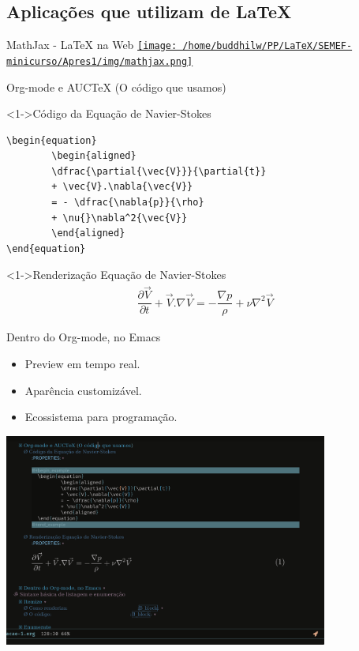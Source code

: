 \documentclass[bigger]{beamer}
\begin{document}
\subsection{Aplicações que utilizam de \LaTeX{}}
\label{sec:orgaa1ea78}
\begin{frame}[label={sec:org1a9b151}]{MathJax - \LaTeX{} na Web}
\href{img/mathjax.png}{\texttt{[image: /home/buddhilw/PP/LaTeX/SEMEF-minicurso/Apres1/img/mathjax.png]}}
\end{frame}


\begin{frame}[label={sec:org42f7375},fragile]{Org-mode e AUCTeX (O código que usamos)}
 \begin{block}<1->{Código da Equação de Navier-Stokes}
\begin{verbatim}
\begin{equation}
        \begin{aligned}
        \dfrac{\partial{\vec{V}}}{\partial{t}}
        + \vec{V}.\nabla{\vec{V}}
        = - \dfrac{\nabla{p}}{\rho}
        + \nu{}\nabla^2{\vec{V}}
        \end{aligned}
\end{equation}
\end{verbatim}
\end{block}

\begin{block}<1->{Renderização Equação de Navier-Stokes}
\begin{equation}
        \begin{aligned}
        \dfrac{\partial{\vec{V}}}{\partial{t}} + \vec{V}.\nabla{\vec{V}} = - \dfrac{\nabla{p}}{\rho} + \nu{}\nabla^2{\vec{V}}
        \end{aligned}
\end{equation}
\end{block}
\end{frame}

\begin{frame}[label={sec:org90805ea}]{Dentro do Org-mode, no Emacs}
\begin{itemize}[<+->]
\item Preview em tempo real.
\item Aparência customizável.
\item Ecossistema para programação.
\end{itemize}

\href{img/orgmode-auctex.png}{\includegraphics[center,width=0.8\textwidth]{./img/orgmode-auctex2.png}}
\end{frame}
\end{document}
